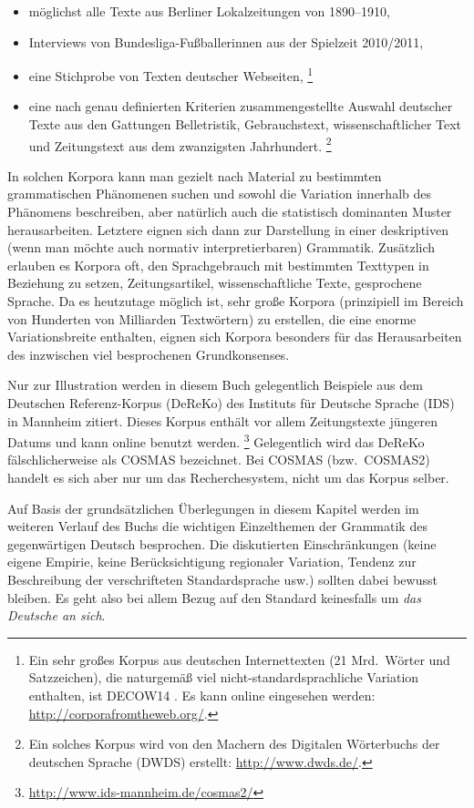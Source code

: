 \begin{itemize}
  \item möglichst alle Texte aus Berliner Lokalzeitungen von 1890--1910,
  \item Interviews von Bundesliga-Fußballerinnen aus der Spielzeit 2010\slash 2011,
  \item eine Stichprobe von Texten deutscher Webseiten,%
    \footnote{Ein sehr großes Korpus aus deutschen Internettexten (21 Mrd.\ Wörter und Satzzeichen), die naturgemäß viel nicht-standardsprachliche Variation enthalten, ist DECOW14 \citep{SchaeferBildhauer2012a}.
    Es kann online eingesehen werden: \url{http://corporafromtheweb.org/}.}
  \item eine nach genau definierten Kriterien zusammengestellte Auswahl deutscher Texte aus den Gattungen Belletristik, Gebrauchstext, wissenschaftlicher Text und Zeitungstext aus dem zwanzigsten Jahrhundert.%
    \footnote{Ein solches Korpus wird von den Machern des Digitalen Wörterbuchs der deutschen Sprache (DWDS) erstellt: \url{http://www.dwds.de/}.}
\end{itemize}

In solchen Korpora kann man gezielt nach Material zu bestimmten grammatischen Phänomenen suchen und sowohl die Variation innerhalb des Phänomens beschreiben, aber natürlich auch die statistisch dominanten Muster herausarbeiten.
Letztere eignen sich dann zur Darstellung in einer deskriptiven (wenn man möchte auch normativ interpretierbaren) Grammatik.
Zusätzlich erlauben es Korpora oft, den Sprachgebrauch mit bestimmten Texttypen in Beziehung zu setzen, \zB Zeitungsartikel, wissenschaftliche Texte, gesprochene Sprache.
Da es heutzutage möglich ist, sehr große Korpora (prinzipiell im Bereich von Hunderten von Milliarden Textwörtern) zu erstellen, die eine enorme Variationsbreite enthalten, eignen sich Korpora besonders für das Herausarbeiten des inzwischen viel besprochenen Grundkonsenses.

Nur zur Illustration werden in diesem Buch gelegentlich Beispiele aus dem Deutschen Referenz-Korpus (DeReKo) des Instituts für Deutsche Sprache (IDS) in Mannheim zitiert.\label{abs:dereko}
Dieses Korpus enthält vor allem Zeitungstexte jüngeren Datums und kann online benutzt werden.%
\footnote{\url{http://www.ids-mannheim.de/cosmas2/}}
Gelegentlich wird das DeReKo fälschlicherweise als COSMAS bezeichnet.
Bei COSMAS (bzw.\ COSMAS2) handelt es sich aber nur um das Recherchesystem, nicht um das Korpus selber.

Auf Basis der grundsätzlichen Überlegungen in diesem Kapitel werden im weiteren Verlauf des Buchs die wichtigen Einzelthemen der Grammatik des gegenwärtigen Deutsch besprochen.
Die diskutierten Einschränkungen (keine eigene Empirie, keine Berücksichtigung regionaler Variation, Tendenz zur Beschreibung der verschrifteten Standardsprache usw.) sollten dabei bewusst bleiben.
Es geht also bei allem Bezug auf den Standard keinesfalls um \textit{das Deutsche an sich}.

